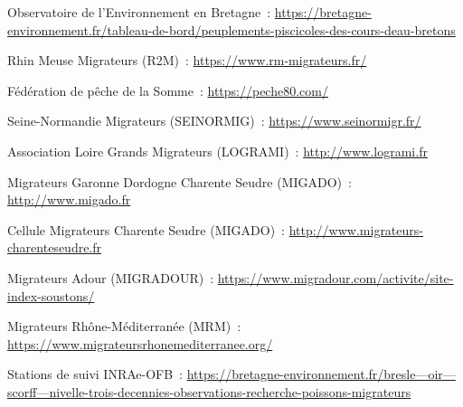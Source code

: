 \documentclass[11pt,twocolumn,titlepage,twoside]{article}\usepackage[]{graphicx}\usepackage[]{xcolor}
\begin{document}
Observatoire de l’Environnement en Bretagne~:
\href{https://bretagne-environnement.fr/tableau-de-bord/peuplements-piscicoles-des-cours-deau-bretons}{{
https://bretagne-environnement.fr/tableau-de-bord/peuplements-piscicoles-des-cours-deau-bretons}}

Rhin Meuse Migrateurs (R2M)~:
\href{https://www.saumon-rhin.com/}{{https://www.rm-migrateurs.fr/}}

Fédération de pêche de la Somme~:
\href{https://peche80.com/}{{https://peche80.com/}}

Seine-Normandie Migrateurs (SEINORMIG)~:
\href{https://www.seinormigr.fr/}{{https://www.seinormigr.fr/}}

Association Loire Grands Migrateurs (LOGRAMI)~:
\href{http://www.logrami.fr}{{http://www.logrami.fr}}

Migrateurs Garonne Dordogne Charente Seudre (MIGADO)~:
\href{http://www.migado.fr}{{http://www.migado.fr}}

Cellule Migrateurs Charente Seudre (MIGADO)~:
\href{http://www.migrateurs-charenteseudre.fr}{{http://www.migrateurs-charenteseudre.fr}}

Migrateurs Adour (MIGRADOUR)~:
\href{https://www.migradour.com/activite/site-index-soustons/}{{https://www.migradour.com/activite/site-index-soustons/}}

Migrateurs Rhône-Méditerranée (MRM)~:
\href{https://www.migrateursrhonemediterranee.org/}{{https://www.migrateursrhonemediterranee.org/}}

Stations de suivi INRAe-OFB~:
\href{https://bretagne-environnement.fr/bresle---oir---scorff---nivelle-trois-decennies-observations-recherche-poissons-migrateurs}{{https://bretagne-environnement.fr/bresle---oir---scorff---nivelle-trois-decennies-observations-recherche-poissons-migrateurs}}


\printbibliography

\clearpage
\end{document}
